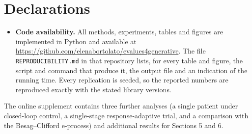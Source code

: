 \documentclass[pdflatex,sn-mathphys-ay]{sn-jnl}
\theoremstyle{thmstyleone}
\theoremstyle{thmstyletwo}
\begin{document}
\section*{Declarations}

\begin{itemize}
\item \textbf{Code availability.} All methods, experiments, tables and figures are implemented in Python and
available at \url{https://github.com/elenabortolato/evalues4generative}. The
file \texttt{REPRODUCIBILITY.md} in that repository lists, for every table
and figure, the script and command that produce it, the output file and an
indication of the running time. Every replication is seeded, so the reported
numbers are reproduced exactly with the stated library versions.
\end{itemize}

\backmatter

The online supplement contains three further analyses (a single patient under
closed-loop control, a single-stage response-adaptive trial, and a comparison
with the Besag--Clifford e-process) and additional results for Sections 5
and 6.
\end{document}
